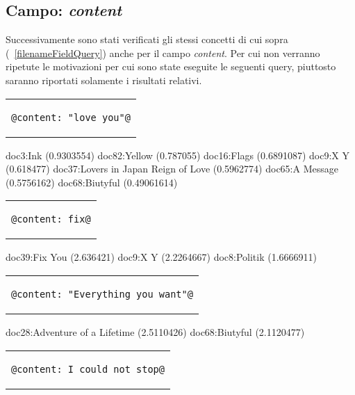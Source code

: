 \documentclass{article}
\begin{document}
\subsection{Campo: \textit{content}}
Successivamente sono stati verificati gli stessi concetti di cui sopra (~\ref{filenameFieldQuery}) anche per il campo \textit{content}. Per cui non verranno ripetute le motivazioni per cui sono state eseguite le seguenti query, piuttosto saranno riportati solamente i risultati relativi.

\begin{center}
\begin{tabular}{c}
\begin{lstlisting}[style=prompt]
    @content: "love you"@
\end{lstlisting}
\end{tabular}    
\end{center}

doc3:Ink (0.9303554)
doc82:Yellow (0.787055)
doc16:Flags (0.6891087)
doc9:X Y (0.618477)
doc37:Lovers in Japan   Reign of Love (0.5962774)
doc65:A Message (0.5756162)
doc68:Biutyful (0.49061614)

\begin{center}
\begin{tabular}{c}
\begin{lstlisting}[style=prompt]
    @content: fix@
\end{lstlisting}
\end{tabular}    
\end{center}

doc39:Fix You (2.636421)
doc9:X Y (2.2264667)
doc8:Politik (1.6666911)

\begin{center}
\begin{tabular}{c}
\begin{lstlisting}[style=prompt]
    @content: "Everything you want"@
\end{lstlisting}
\end{tabular}    
\end{center}

doc28:Adventure of a Lifetime (2.5110426)
doc68:Biutyful (2.1120477)

\begin{center}
\begin{tabular}{c}
\begin{lstlisting}[style=prompt]
    @content: I could not stop@
\end{lstlisting}
\end{tabular}    
\end{center}
\end{document}
